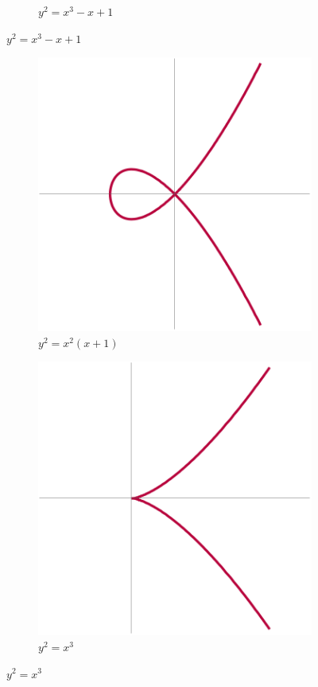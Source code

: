 \begin{frame}[plain]
\begin{figure}[h]
\begin{subfigure}{0.30\textwidth}
	\caption*{$y^2 = x^3 - x + 1$}
	\end{subfigure}
	\end{figure}
	\begin{figure}
	\centering
	\begin{subfigure}{0.30\textwidth}
	\includegraphics[width=\textwidth]{images/ec3.png}
	\caption*{$y^2 = x^2 (x + 1)$}
	\end{subfigure} \qquad\qquad
	\begin{subfigure}{0.30\textwidth}
	\includegraphics[width=\textwidth]{images/ec4.png}
	\caption*{$y^2= x^3$}
	\end{subfigure}
	\end{figure}
\end{frame}



